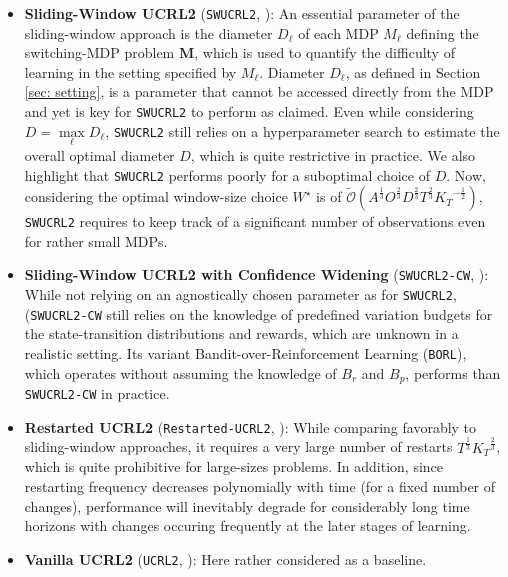 \documentclass{article} %
\begin{document}
\begin{itemize}
    \item \textbf{Sliding-Window UCRL2} (\texttt{SWUCRL2},  \cite{SWUCRL}): An essential parameter of the sliding-window approach is the diameter $D_\ell$ of each MDP $M_\ell$ defining the switching-MDP problem $\mathbf{M}$, which is used to quantify the difficulty of learning in the setting specified by $M_\ell$. Diameter $D_\ell$, as defined in Section \ref{sec: setting}, is a parameter that cannot be accessed directly from the MDP and yet is key for \texttt{SWUCRL2} to perform as claimed. Even while considering $D = \max\limits_{\ell} D_\ell$, \texttt{SWUCRL2} still relies on a hyperparameter search to estimate the overall optimal diameter $D$, which is quite restrictive in practice. We also highlight that \texttt{SWUCRL2} performs poorly for a suboptimal choice of $D$. Now, considering the optimal window-size choice $W^\star$ is of $\tilde{\mathcal{O}}(A^{\frac{1}{3}} O^{\frac{2}{3}} D^{\frac{2}{3}} T^{\frac{2}{3}} {K_T}^{-\frac{1}{2}})$, \texttt{SWUCRL2} requires to keep track of a significant number of observations even for rather small MDPs. 
    \item \textbf{Sliding-Window UCRL2 with Confidence Widening} (\texttt{SWUCRL2-CW}, \cite{SWUCRL2CW}): While not relying on an agnostically chosen parameter as for \texttt{SWUCRL2}, (\texttt{SWUCRL2-CW} still relies on the knowledge of predefined variation budgets for the state-transition distributions and rewards, which are unknown in a realistic setting. Its variant Bandit-over-Reinforcement Learning (\texttt{BORL}), which operates without assuming the knowledge of $B_r$ and $B_p$, performs than \texttt{SWUCRL2-CW} in practice. 
    \item \textbf{Restarted UCRL2} (\texttt{Restarted-UCRL2}, \cite{UCRL2}): While comparing favorably to sliding-window approaches, it requires a very large number of restarts $T^{\frac{1}{3}} {K_T}^{\frac{2}{3}}$, which is quite prohibitive for large-sizes problems. In addition, since restarting frequency decreases polynomially with time (for a fixed number of changes),  performance will inevitably degrade for considerably long time horizons with changes occuring frequently at the later stages of learning. 
    \item \textbf{Vanilla UCRL2} (\texttt{UCRL2}, \cite{UCRL2}): Here rather considered as a baseline. 
\end{itemize}
\end{document}
